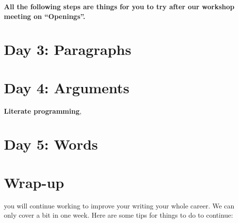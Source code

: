 \documentclass[]{tufte-book}
\begin{document}
\textbf{All the following steps are things for you to try after our workshop
meeting on ``Openings''.}

\hypertarget{day-3-paragraphs}{%
\chapter{Day 3: Paragraphs}\label{day-3-paragraphs}}


\hypertarget{day-4-arguments}{%
\chapter{Day 4: Arguments}\label{day-4-arguments}}

\textbf{Literate programming},

\hypertarget{day-5-words}{%
\chapter{Day 5: Words}\label{day-5-words}}


\hypertarget{wrap-up}{%
\chapter{Wrap-up}\label{wrap-up}}

 you will continue working to improve your
writing your whole career. We can only cover a bit in one week. Here are some tips for
things to do to continue:
\end{document}
